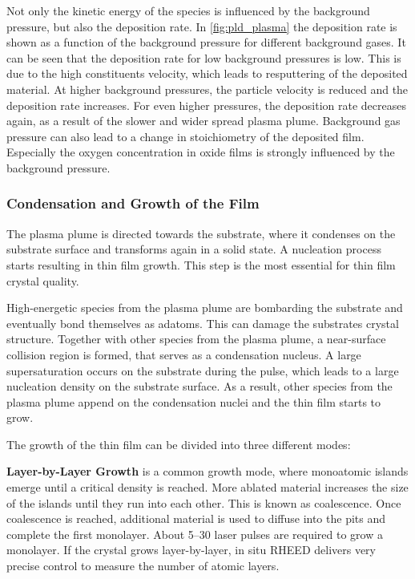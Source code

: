Not only the kinetic energy of the species is influenced by the background pressure,
but also the deposition rate. 
In \cref{fig:pld_plasma} the deposition rate is shown as a function of the background
pressure for different background gases.
It can be seen that the deposition rate for low background pressures is low.
This is due to the high constituents velocity, which leads to resputtering of the
deposited material.
At higher background pressures, the particle velocity is reduced and the deposition
rate increases.
For even higher pressures, the deposition rate decreases again, 
as a result of the slower and wider spread plasma plume.
Background gas pressure can also lead to a change in stoichiometry of the deposited 
film.
Especially the oxygen concentration in oxide films is strongly influenced by the
background pressure.

\subsubsection{Condensation and Growth of the Film}
The plasma plume is directed towards the substrate, where it condenses on 
the substrate surface and transforms again in a solid state.
A nucleation process starts resulting in thin film growth. 
This step is the most essential for thin film crystal quality.

High-energetic species from the plasma plume are bombarding the substrate
and eventually bond themselves as adatoms. 
This can damage the substrates crystal structure.
Together with other species from the plasma plume, a near-surface collision region is
formed, that serves as a condensation nucleus. 
A large supersaturation occurs on the substrate during the pulse, which leads to a
large nucleation density on the substrate surface.
As a result, other species from the plasma plume append on the condensation nuclei and
the thin film starts to grow.

The growth of the thin film can be divided into three different modes:

\textbf{Layer-by-Layer Growth} is a common growth mode, where monoatomic islands 
emerge until a critical density is reached. 
More ablated material increases the size of the islands until they run into each other.
This is known as coalescence. 
Once coalescence is reached, additional material is used to diffuse into the pits and
complete the first monolayer.
About \numrange{5}{30} laser pulses are required to grow a monolayer.
If the crystal grows layer-by-layer, in situ RHEED delivers very precise control to
measure the number of atomic layers. 

